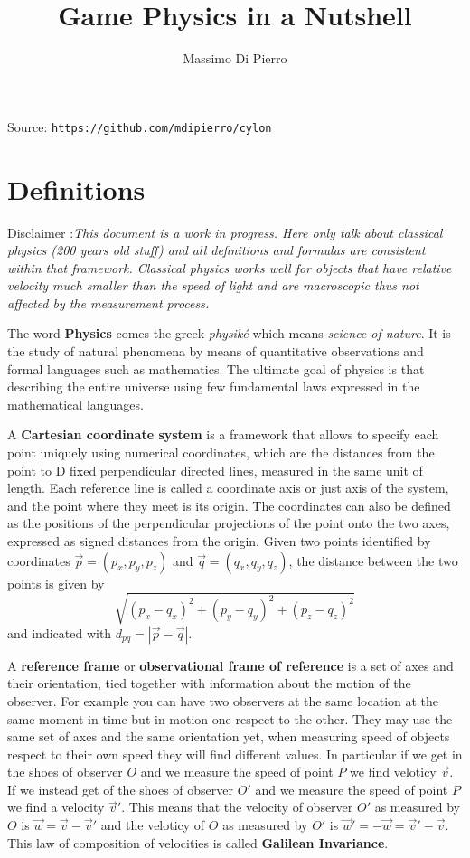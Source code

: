 \documentclass[12pt]{article}
\title{Game Physics in a Nutshell}
\author{Massimo Di Pierro}
\date{}
\begin{document}
\maketitle
\tableofcontents
\newpage

Source: {\tt https://github.com/mdipierro/cylon}

\section{Definitions}

Disclaimer :{\it This document is a work in progress. Here only talk about classical physics (200 years old stuff) and all definitions and formulas are consistent within that framework. Classical physics works well for objects that have relative velocity much smaller than the speed of light and are macroscopic thus not affected by the measurement process.}

The word {\bf Physics} comes the greek {\it physik\'e} which means
{\it science of nature}. It is the study of natural phenomena by means of
quantitative observations and formal languages such as
mathematics. The ultimate goal of physics is that describing the
entire universe using few fundamental laws expressed in the
mathematical languages.

A {\bf Cartesian coordinate system} is a framework that allows to specify each point uniquely using numerical coordinates, which are the distances from the point to D fixed perpendicular directed lines, measured in the same unit of length. Each reference line is called a coordinate axis or just axis of the system, and the point where they meet is its origin. The coordinates can also be defined as the positions of the perpendicular projections of the point onto the two axes, expressed as signed distances from the origin. Given two points identified by coordinates $\vec p = (p_x,p_y,p_z)$ and $\vec q = (q_x,q_y,q_z)$, the distance between the two points is given by 
\begin{equation}
\sqrt{(p_x-q_x)^2+(p_y-q_y)^2+(p_z-q_z)^2}
\end{equation}
and indicated with $d_{pq} = \left|\vec p - \vec q\right|$.

A {\bf reference frame} or {\bf observational frame of reference} is a set of axes and their orientation, tied together with information about the motion of the observer. For example you can have two observers at the same location at the same moment in time but in motion one respect to the other. They may use the same set of axes and the same orientation yet, when measuring speed of objects respect to their own speed they will find different values. In particular if we get in the shoes of observer $O$ and we measure the speed of point $P$ we find veloticy $\vec v$. If we instead get of the shoes of observer $O'$ and we measure the speed of point $P$ we find a velocity $\vec v'$. This means that the velocity of observer $O'$ as measured by $O$ is $\vec w = \vec v-\vec v'$ and the veloticy of $O$ as measured by $O'$ is $\vec w' = - \vec w = \vec v'-\vec v$. This law of composition of velocities is called {\bf Galilean Invariance}.
\end{document}
